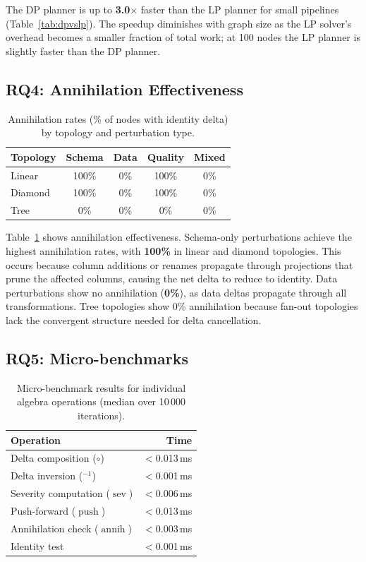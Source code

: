 \documentclass[sigplan,screen,nonacm]{acmart}
\newcommand{\compose}{\mathbin{\circ}}
\newcommand{\push}{\operatorname{push}}
\newcommand{\severity}{\operatorname{sev}}
\newcommand{\annihilate}{\operatorname{annih}}
\begin{document}
The DP planner is up to \textbf{3.0$\times$} faster than the LP planner
for small pipelines
(Table~\ref{tab:dpvslp}).  The speedup diminishes with graph size as
the LP solver's overhead becomes a smaller fraction of total work; at
100 nodes the LP planner is slightly faster than the DP planner.

\subsection{RQ4: Annihilation Effectiveness}

\begin{table}[t]
\caption{Annihilation rates (\% of nodes with identity delta) by
  topology and perturbation type.}
\label{tab:annihilation}
\centering\small
\begin{tabular}{@{}lcccc@{}}
\toprule
\textbf{Topology} & \textbf{Schema} & \textbf{Data} &
  \textbf{Quality} & \textbf{Mixed} \\
\midrule
Linear    & 100\%   & 0\%  & 100\%  & 0\% \\
Diamond   & 100\%   & 0\%  & 100\%  & 0\% \\
Tree      & 0\%    & 0\%  & 0\%  & 0\% \\
\bottomrule
\end{tabular}
\end{table}

Table~\ref{tab:annihilation} shows annihilation effectiveness.
Schema-only perturbations achieve the highest annihilation rates,
with \textbf{100\%} in linear and diamond topologies.  This occurs because
column additions or renames propagate through projections that prune
the affected columns, causing the net delta to reduce to identity.
Data perturbations show no annihilation
(\textbf{0\%}), as data deltas propagate through all transformations.
Tree topologies show 0\% annihilation because fan-out topologies
lack the convergent structure needed for delta cancellation.

\subsection{RQ5: Micro-benchmarks}

\begin{table}[t]
\caption{Micro-benchmark results for individual algebra operations
  (median over 10\,000 iterations).}
\label{tab:micro}
\centering\small
\begin{tabular}{@{}lr@{}}
\toprule
\textbf{Operation} & \textbf{Time} \\
\midrule
Delta composition ($\compose$)    & $<$0.013\,ms \\
Delta inversion (${}^{-1}$)       & $<$0.001\,ms \\
Severity computation ($\severity$) & $<$0.006\,ms \\
Push-forward ($\push$)             & $<$0.013\,ms \\
Annihilation check ($\annihilate$) & $<$0.003\,ms \\
Identity test                      & $<$0.001\,ms \\
\bottomrule
\end{tabular}
\end{table}
\end{document}

